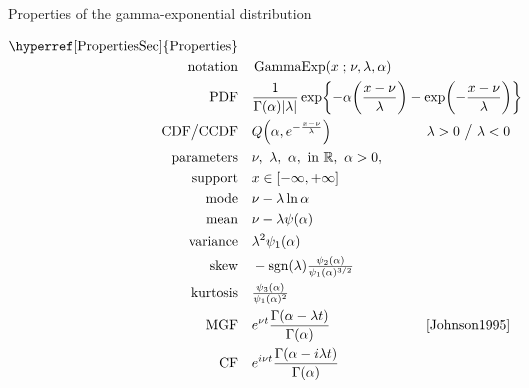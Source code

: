 

\begin{table*}[tp!]
\caption[Gamma-exponential distribution -- Properties]{Properties of the gamma-exponential distribution}
\begin{align*}
\text{\hyperref[PropertiesSec]{Properties}}  \quad& \\
\text{notation} \quad &  \op{GammaExp}(x \given \nu, \lambda, \alpha)  			\checked
\\
\text{PDF}\quad &   \frac{1}{ \Gamma(\alpha) |\lambda|}  \exp\Left\{- \alpha \Left(\frac{x-\nu}{\lambda}\Right) - \exp\Left(-\frac{x-\nu}{\lambda}\Right)  \Right\} \checked \hspace{-8em}												
\\
\text{CDF} \big/ \text{CCDF} \quad  &   Q\Left(\alpha, e^{-\frac{x-\nu}{\lambda} }\Right) 
& \lambda>0 \ \big/ \ \lambda<0  \checked
\\
\text{parameters}\quad &   \nu,\ \lambda,\ \alpha,\   \text{in } \Real, \ \alpha>0, \ 		\checked
\\
\text{support} \quad &   x \in [-\infty, +\infty]									\checked
\\
\text{mode} \quad  & \nu -\lambda \ln \alpha \checked
\\
\text{mean} \quad  &   \nu- \lambda \psi(\alpha)	\checked
\\
\text{variance} \quad  &  \lambda^2 \psi_1(\alpha)	\checked
\\
\text{skew} \quad  &   -\text{sgn}(\lambda) \tfrac{\psi_2(\alpha) }{  \psi_1(\alpha)^{3/2} }  \checked
\\
\text{kurtosis} \quad  &     \tfrac{ \psi_3(\alpha) }{  \psi_1(\alpha)^{2}} \checked
\\
\text{MGF} \quad  &   e^{\nu t } \frac{\Gamma(\alpha-\lambda t)}{\Gamma(\alpha)}  \checked
& \text{\cite{Johnson1995}}  %
\\
\text{CF} \quad  &  e^{i \nu t } \frac{\Gamma(\alpha-i \lambda t)}{\Gamma(\alpha)} \checked
\end{align*}
\end{table*}

